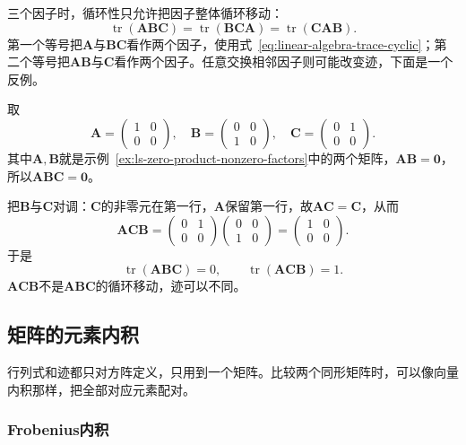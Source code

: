 三个因子时，循环性只允许把因子整体循环移动：
\[
 \operatorname{tr}(\bm A\bm B\bm C)=\operatorname{tr}(\bm B\bm C\bm A)=\operatorname{tr}(\bm C\bm A\bm B).
\]
第一个等号把$\bm A$与$\bm B\bm C$看作两个因子，使用式~\eqref{eq:linear-algebra-trace-cyclic}；第二个等号把$\bm A\bm B$与$\bm C$看作两个因子。任意交换相邻因子则可能改变迹，下面是一个反例。
\begin{example}[反例：交换相邻因子会改变迹]
\label{ex:ls-trace-adjacent-swap}
取
\[
 \bm A=\begin{pmatrix}1&0\\0&0\end{pmatrix},\quad
 \bm B=\begin{pmatrix}0&0\\1&0\end{pmatrix},\quad
 \bm C=\begin{pmatrix}0&1\\0&0\end{pmatrix}.
\]
其中$\bm A,\bm B$就是示例~\ref{ex:ls-zero-product-nonzero-factors}中的两个矩阵，$\bm A\bm B=\bm0$，所以$\bm A\bm B\bm C=\bm0$。

把$\bm B$与$\bm C$对调：$\bm C$的非零元在第一行，$\bm A$保留第一行，故$\bm A\bm C=\bm C$，从而
\[
 \bm A\bm C\bm B=\begin{pmatrix}0&1\\0&0\end{pmatrix}\begin{pmatrix}0&0\\1&0\end{pmatrix}=\begin{pmatrix}1&0\\0&0\end{pmatrix}.
\]
于是
\[
 \operatorname{tr}(\bm A\bm B\bm C)=0,\qquad
 \operatorname{tr}(\bm A\bm C\bm B)=1.
\]$\bm A\bm C\bm B$不是$\bm A\bm B\bm C$的循环移动，迹可以不同。
\end{example}

\subsection{矩阵的元素内积}

行列式和迹都只对方阵定义，只用到一个矩阵。比较两个同形矩阵时，可以像向量内积那样，把全部对应元素配对。

\subsubsection{Frobenius内积}

